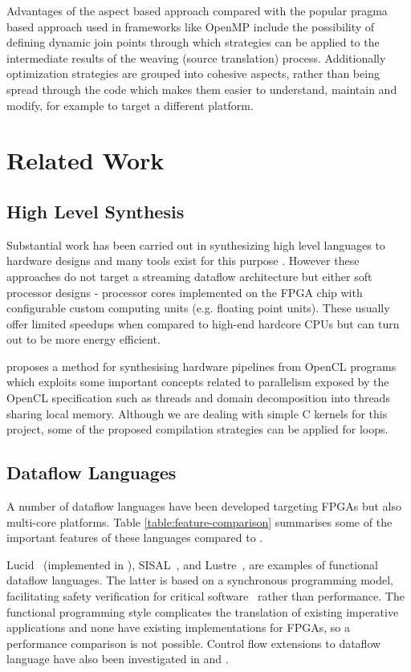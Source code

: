 Advantages of the aspect based approach compared with the popular
pragma based approach used in frameworks like
OpenMP \cite{Ferrer:Judit:Bellens:Duran:Gonzalez:Marorell:Badia:Ayquade:Labarta:2011}
include the possibility of defining dynamic join points through which
strategies can be applied to the intermediate results of the weaving
(source translation) process. Additionally optimization strategies are
grouped into cohesive aspects, rather than being spread through the
code which makes them easier to understand, maintain and modify, for
example to target a different platform.


\section{Related Work}

\subsection{High Level Synthesis}

Substantial work has been carried out in synthesizing high level
languages to hardware designs and many tools exist for this purpose
\cite{CtoVerilog, Vivado, ImpulseC}. However these approaches
do not target a streaming dataflow architecture but either soft
processor designs - processor cores implemented on the FPGA chip with
configurable custom computing units (e.g. floating point units). These
usually offer limited speedups when compared to high-end hardcore
CPUs but can turn out to be more energy efficient.

\cite{Czerniawski} proposes a method for synthesising hardware
pipelines from OpenCL programs which exploits some important concepts
related to parallelism exposed by the OpenCL specification
\cite{OpenCL} such as threads and domain decomposition into threads
sharing local memory. Although we are dealing with simple C kernels
for this project, some of the proposed compilation strategies can be
applied for loops.

\subsection{Dataflow Languages}
A number of dataflow languages have been developed targeting FPGAs but
also multi-core platforms. Table \ref{table:feature-comparison}
summarises some of the important features of these languages compared
to \FAST{}.

Lucid~\cite{ashcroft1977lucid} (implemented in \cite{pLucid}),
SISAL~\cite{gurd1987implicit,mcgraw1983sisal}, and
Lustre~\cite{halbwachs1991synchronous}, are examples of functional
dataflow languages. The latter is based on a synchronous programming
model, facilitating safety verification for critical
software~\cite{halbwachs1992programming} rather than performance. The
functional programming style complicates the translation of existing
imperative applications and none have existing implementations for
FPGAs, so a performance comparison is not possible. Control flow
extensions to dataflow language have also been investigated in
\cite{143862} and \cite{183202}. 

